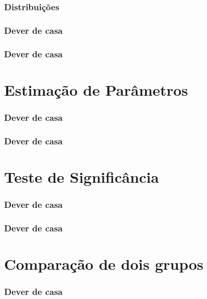 \documentclass[graphics,14pt]{beamer}
\begin{document}
\begin{frame}[t,fragile=singleslide]
\frametitle{Distribuições}
	

\end{frame}
\begin{frame}[t,fragile=singleslide]
\frametitle{Dever de casa}
\end{frame}
\begin{frame}[t,fragile=singleslide]
\frametitle{Dever de casa}
\end{frame}
\section[Estimação de Parâmetros]{Estimação de Parâmetros}
\begin{frame}[t,fragile=singleslide]
\frametitle{Dever de casa}
\end{frame}

\begin{frame}[t,fragile=singleslide]
\frametitle{Dever de casa}
\end{frame}
\section[Teste de Significância]{Teste de Significância}
\begin{frame}[t,fragile=singleslide]
\frametitle{Dever de casa}
\end{frame}

\begin{frame}[t,fragile=singleslide]
\frametitle{Dever de casa}
\end{frame}
\section{Comparação de dois grupos}
\begin{frame}[t,fragile=singleslide]
\frametitle{Dever de casa}
\end{frame}
\end{document}
